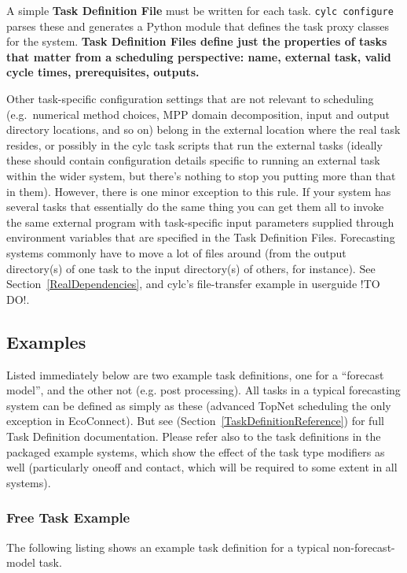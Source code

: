 \documentclass[11pt,a4paper]{article}
\begin{document}
A simple {\bf Task Definition File} must be written for each task.
\lstinline=cylc configure= parses these and generates a Python module
that defines the task proxy classes for the system. {\bf Task
Definition Files define just the properties of tasks that matter from a
scheduling perspective: name, external task, valid cycle times,
prerequisites, outputs.} 

Other task-specific configuration settings that are not relevant to
scheduling (e.g.\ numerical method choices, MPP
domain decomposition, input and output directory locations, and so on)
belong in the external location where the real task resides, or possibly
in the cylc task scripts that run the external tasks (ideally these
should contain configuration details specific to running an external
task within the wider system, but there's nothing to stop you putting
more than that in them). However, there is one minor exception to this
rule. If your system has several tasks that essentially do the same
thing you can get them all to invoke the same external program with
task-specific input parameters supplied through environment variables
that are specified in the Task Definition Files. Forecasting systems
commonly have to move a lot of files around (from the output
directory(s) of one task to the input directory(s) of others, for
instance). See Section~\ref{RealDependencies}, and cylc's file-transfer
example in userguide !TO DO!. 

\subsection{Examples}

Listed immediately below are two example task definitions, one for a
``forecast model'', and the other not (e.g. post processing). All tasks
in a typical forecasting system can be defined as simply as these
(advanced TopNet scheduling the only exception in EcoConnect). 
But see (Section~\ref{TaskDefinitionReference}) for full Task Definition
documentation. Please refer also to the task definitions in the packaged
example systems, which show the effect of the task type modifiers as well
(particularly oneoff and contact, which will be required to some extent
in all systems).


\subsubsection{Free Task Example}

The following listing shows an example task definition for a
typical non-forecast-model task.
\lstset{language=cylctaskdef}
\end{document}

